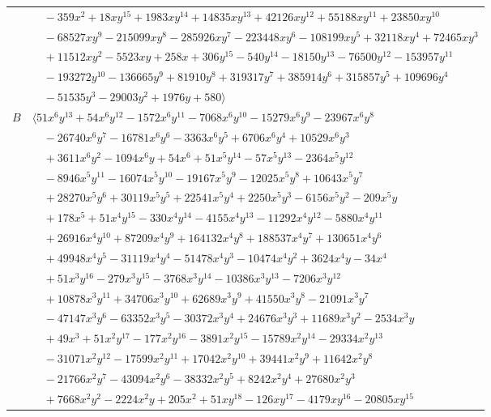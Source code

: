 \documentclass[11pt]{article}
\begin{document}
\begin{longtable}{@{}ll@{}}
 & $\quad -359x^{2}+18xy^{15}+1983xy^{14}+14835xy^{13}+42126xy^{12}+55188xy^{11}+23850xy^{10}$\\
 & $\quad -68527xy^{9}-215099xy^{8}-285926xy^{7}-223448xy^{6}-108199xy^{5}+32118xy^{4}+72465xy^{3}$\\
 & $\quad +11512xy^{2}-5523xy+258x+306y^{15}-540y^{14}-18150y^{13}-76500y^{12}-153957y^{11}$\\
 & $\quad -193272y^{10}-136665y^{9}+81910y^{8}+319317y^{7}+385914y^{6}+315857y^{5}+109696y^{4}$\\
 & $\quad -51535y^{3}-29003y^{2}+1976y+580\rangle$\\
$B$ & $\langle 51x^{6}y^{13}+54x^{6}y^{12}-1572x^{6}y^{11}-7068x^{6}y^{10}-15279x^{6}y^{9}-23967x^{6}y^{8}$\\
 & $\quad -26740x^{6}y^{7}-16781x^{6}y^{6}-3363x^{6}y^{5}+6706x^{6}y^{4}+10529x^{6}y^{3}$\\
 & $\quad +3611x^{6}y^{2}-1094x^{6}y+54x^{6}+51x^{5}y^{14}-57x^{5}y^{13}-2364x^{5}y^{12}$\\
 & $\quad -8946x^{5}y^{11}-16074x^{5}y^{10}-19167x^{5}y^{9}-12025x^{5}y^{8}+10643x^{5}y^{7}$\\
 & $\quad +28270x^{5}y^{6}+30119x^{5}y^{5}+22541x^{5}y^{4}+2250x^{5}y^{3}-6156x^{5}y^{2}-209x^{5}y$\\
 & $\quad +178x^{5}+51x^{4}y^{15}-330x^{4}y^{14}-4155x^{4}y^{13}-11292x^{4}y^{12}-5880x^{4}y^{11}$\\
 & $\quad +26916x^{4}y^{10}+87209x^{4}y^{9}+164132x^{4}y^{8}+188537x^{4}y^{7}+130651x^{4}y^{6}$\\
 & $\quad +49948x^{4}y^{5}-31119x^{4}y^{4}-51478x^{4}y^{3}-10474x^{4}y^{2}+3624x^{4}y-34x^{4}$\\
 & $\quad +51x^{3}y^{16}-279x^{3}y^{15}-3768x^{3}y^{14}-10386x^{3}y^{13}-7206x^{3}y^{12}$\\
 & $\quad +10878x^{3}y^{11}+34706x^{3}y^{10}+62689x^{3}y^{9}+41550x^{3}y^{8}-21091x^{3}y^{7}$\\
 & $\quad -47147x^{3}y^{6}-63352x^{3}y^{5}-30372x^{3}y^{4}+24676x^{3}y^{3}+11689x^{3}y^{2}-2534x^{3}y$\\
 & $\quad +49x^{3}+51x^{2}y^{17}-177x^{2}y^{16}-3891x^{2}y^{15}-15789x^{2}y^{14}-29334x^{2}y^{13}$\\
 & $\quad -31071x^{2}y^{12}-17599x^{2}y^{11}+17042x^{2}y^{10}+39441x^{2}y^{9}+11642x^{2}y^{8}$\\
 & $\quad -21766x^{2}y^{7}-43094x^{2}y^{6}-38332x^{2}y^{5}+8242x^{2}y^{4}+27680x^{2}y^{3}$\\
 & $\quad +7668x^{2}y^{2}-2224x^{2}y+205x^{2}+51xy^{18}-126xy^{17}-4179xy^{16}-20805xy^{15}$\\

\end{longtable}
\end{document}
